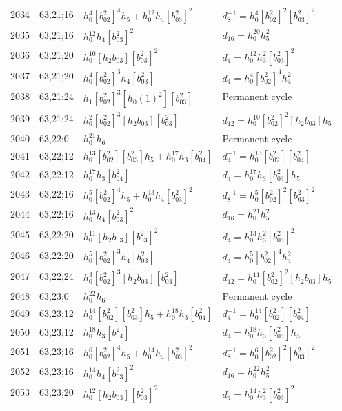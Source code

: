 \documentclass{article}
\begin{document}
\begin{longtable}{|l|l|>{\raggedright\arraybackslash}p{6cm}|>{\raggedright\arraybackslash}p{6cm}|}
\hline
2034 & 63,21;16 & $h_0^4[b_{02}^2]^4h_5 + h_0^{12}h_4[b_{03}^2]^2$ & $d_{8}^{-1}=h_0^4[b_{02}^2]^2[b_{03}^2]^2$\\
2035 & 63,21;16 & $h_0^{12}h_4[b_{03}^2]^2$ &$d_{16}=h_0^{20}h_5^2$\\
\hline
2036 & 63,21;20 & $h_0^{10}[h_2b_{03}][b_{03}^2]^2$ &$d_{4}=h_0^{12}h_3^2[b_{03}^2]^2$\\
2037 & 63,21;20 & $h_0^4[b_{02}^2]^3h_4[b_{03}^2]$ &$d_{4}=h_0^4[b_{02}^2]^4h_4^2$\\
\hline
2038 & 63,21;24 & $h_1[b_{02}^2]^3[h_0(1)^2][b_{03}^2]$ & Permanent cycle\\
2039 & 63,21;24 & $h_0^2[b_{02}^2]^3[h_2b_{03}][b_{03}^2]$ &$d_{12}=h_0^{10}[b_{02}^2]^2[h_2b_{03}]h_5$\\
\hline
2040 & 63,22;0 & $h_0^{21}h_6$ & Permanent cycle\\
\hline
2041 & 63,22;12 & $h_0^{13}[b_{02}^2][b_{03}^2]h_5 + h_0^{17}h_3[b_{04}^2]$ & $d_{4}^{-1}=h_0^{13}[b_{02}^2][b_{04}^2]$\\
2042 & 63,22;12 & $h_0^{17}h_3[b_{04}^2]$ &$d_{4}=h_0^{17}h_3[b_{03}^2]h_5$\\
\hline
2043 & 63,22;16 & $h_0^5[b_{02}^2]^4h_5 + h_0^{13}h_4[b_{03}^2]^2$ & $d_{8}^{-1}=h_0^5[b_{02}^2]^2[b_{03}^2]^2$\\
2044 & 63,22;16 & $h_0^{13}h_4[b_{03}^2]^2$ &$d_{16}=h_0^{21}h_5^2$\\
\hline
2045 & 63,22;20 & $h_0^{11}[h_2b_{03}][b_{03}^2]^2$ &$d_{4}=h_0^{13}h_3^2[b_{03}^2]^2$\\
2046 & 63,22;20 & $h_0^5[b_{02}^2]^3h_4[b_{03}^2]$ &$d_{4}=h_0^5[b_{02}^2]^4h_4^2$\\
\hline
2047 & 63,22;24 & $h_0^3[b_{02}^2]^3[h_2b_{03}][b_{03}^2]$ &$d_{12}=h_0^{11}[b_{02}^2]^2[h_2b_{03}]h_5$\\
\hline
2048 & 63,23;0 & $h_0^{22}h_6$ & Permanent cycle\\
\hline
2049 & 63,23;12 & $h_0^{14}[b_{02}^2][b_{03}^2]h_5 + h_0^{18}h_3[b_{04}^2]$ & $d_{4}^{-1}=h_0^{14}[b_{02}^2][b_{04}^2]$\\
2050 & 63,23;12 & $h_0^{18}h_3[b_{04}^2]$ &$d_{4}=h_0^{18}h_3[b_{03}^2]h_5$\\
\hline
2051 & 63,23;16 & $h_0^6[b_{02}^2]^4h_5 + h_0^{14}h_4[b_{03}^2]^2$ & $d_{8}^{-1}=h_0^6[b_{02}^2]^2[b_{03}^2]^2$\\
2052 & 63,23;16 & $h_0^{14}h_4[b_{03}^2]^2$ &$d_{16}=h_0^{22}h_5^2$\\
\hline
2053 & 63,23;20 & $h_0^{12}[h_2b_{03}][b_{03}^2]^2$ &$d_{4}=h_0^{14}h_3^2[b_{03}^2]^2$\\

\end{longtable}
\end{document}
